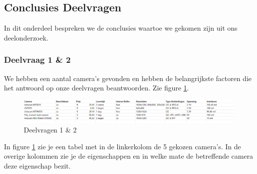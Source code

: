 \documentclass{article}
\begin{document}
\subsection{Conclusies Deelvragen}
In dit onderdeel bespreken we de conclusies waartoe we gekomen zijn uit ons deelonderzoek.

\subsubsection{Deelvraag 1 {\&} 2}
We hebben een aantal camera's gevonden en hebben de belangrijkste factoren die het antwoord op onze deelvragen beantwoorden.
Zie figure \ref{fig:deelvragen1en2}.


\begin{figure}[h]
	\includegraphics[width=40em]{table2}
	\centering
	\caption{Deelvragen 1 {\&} 2}
	\label{fig:deelvragen1en2}
	\end{figure}

In figure \ref{fig:deelvragen1en2} zie je een tabel met in de linkerkolom de 5 gekozen camera's. In de overige kolommen zie je de eigenschappen en in welke mate de betreffende camera deze eigenschap bezit.
\end{document}
